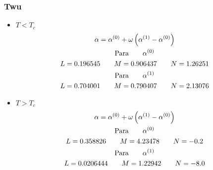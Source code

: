 \subsubsection{Twu \cite{twuactivity}}
\begin{itemize}
\item{$T < T_c$}
\begin{gather}
\alpha = \alpha^{(0)} + \omega\left(\alpha^{(1)}-\alpha^{(0)}\right)\\
\text{Para}\qquad \alpha^{(0)}\notag\\
L= 0.196545\qquad M=0.906437\qquad N=1.26251\\
\text{Para}\qquad \alpha^{(1)}\notag\\
L=0.704001 \qquad M =0.790407 \qquad N=2.13076
\end{gather}
\item{$T > T_c$}
\begin{gather}
\alpha = \alpha^{(0)} + \omega\left(\alpha^{(1)}-\alpha^{(0)}\right)\\
\text{Para}\qquad \alpha^{(0)}\notag\\
L= 0.358826\qquad M=4.23478\qquad N=-0.2\\
\text{Para}\qquad \alpha^{(1)}\notag\\
L=0.0206444 \qquad M =1.22942 \qquad N=-8.0
\end{gather}
\end{itemize}